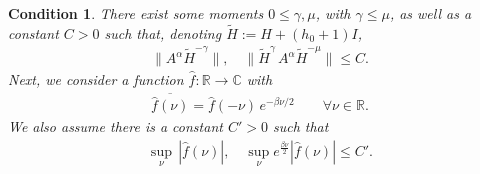 \documentclass[11pt]{amsart}
\newcommand{\1}{\mathbbm{1}}
\newtheorem{conditionA}{Condition}
\newcommand{\spec}{\operatorname{Sp}}
\theoremstyle{plain}
\theoremstyle{definition}
\theoremstyle{remark}
\numberwithin{equation}{section}
\begin{document}
 

\begin{framed}
\begin{conditionA}\label{eq:condAalphas}
There exist some moments $0\le\gamma,  \mu$, with $\gamma\le \mu$, as well as a constant $C>0$ such that, denoting $\widetilde{H}:=H+(h_0+1)I$,
\begin{align}
\label{eq:BoundBareJumpsWithHam}
\|A^\alpha \widetilde{H}^{-\gamma}\|,\quad \|\widetilde{H}^\gamma\,A^\alpha \widetilde{H}^{-\mu}\|\le C.
\end{align}
Next, we consider a function $\widehat{f}:\mathbb{R}\to\mathbb{C}$ with 
\begin{align}
\label{eq:KMSFilterFunction}
\overline{\widehat{f}(\nu)}=\widehat{f}(-\nu)\,e^{-\beta\nu/2}\qquad \forall\nu\in\mathbb{R}.
\end{align}
We also assume there is a constant $C'>0$ such that
\begin{align}
\sup_\nu\,|\widehat{f}(\nu)|,\quad  \sup_{\nu}e^{\frac{\beta\nu}{2}}|\widehat{f}(\nu)| \le C'.
\end{align}
\end{conditionA}
\end{framed}
\end{document}
